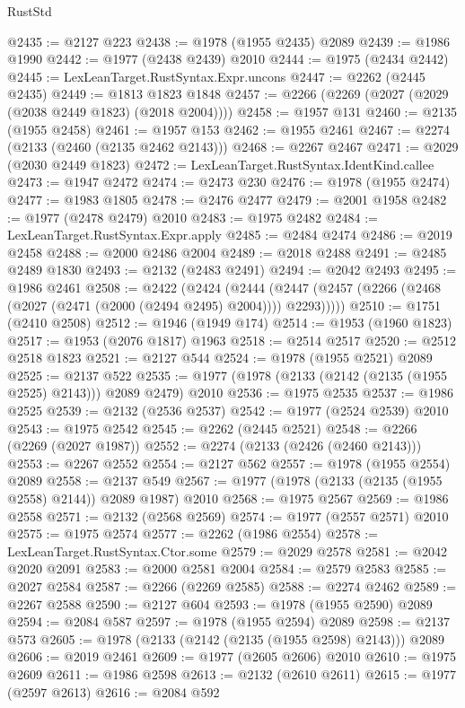 \begin{lexlean}{RustStd}
\begin{coremodule}
{\begin{coremodule}
{{{{{{{{{{{{{{{{{{{{{{{{{{{{{{{@2435 := @2127 @223
@2438 := @1978 (@1955 @2435) @2089
@2439 := @1986 @1990
@2442 := @1977 (@2438 @2439) @2010
@2444 := @1975 (@2434 @2442)
@2445 := LexLeanTarget.RustSyntax.Expr.uncons
@2447 := @2262 (@2445 @2435)
@2449 := @1813 @1823 @1848
@2457 := @2266 (@2269 (@2027 (@2029 (@2038 @2449 @1823) (@2018 @2004))))
@2458 := @1957 @131
@2460 := @2135 (@1955 @2458)
@2461 := @1957 @153
@2462 := @1955 @2461
@2467 := @2274 (@2133 (@2460 (@2135 @2462 @2143)))
@2468 := @2267 @2467
@2471 := @2029 (@2030 @2449 @1823)
@2472 := LexLeanTarget.RustSyntax.IdentKind.callee
@2473 := @1947 @2472
@2474 := @2473 @230
@2476 := @1978 (@1955 @2474)
@2477 := @1983 @1805
@2478 := @2476 @2477
@2479 := @2001 @1958
@2482 := @1977 (@2478 @2479) @2010
@2483 := @1975 @2482
@2484 := LexLeanTarget.RustSyntax.Expr.apply
@2485 := @2484 @2474
@2486 := @2019 @2458
@2488 := @2000 @2486 @2004
@2489 := @2018 @2488
@2491 := @2485 @2489 @1830
@2493 := @2132 (@2483 @2491)
@2494 := @2042 @2493
@2495 := @1986 @2461
@2508 := @2422
    (@2424
      (@2444 (@2447 (@2457 (@2266 (@2468 (@2027 (@2471 (@2000 (@2494 @2495) @2004)))) @2293)))))
@2510 := @1751 (@2410 @2508)
@2512 := @1946 (@1949 @174)
@2514 := @1953 (@1960 @1823)
@2517 := @1953 (@2076 @1817) @1963
@2518 := @2514 @2517
@2520 := @2512 @2518 @1823
@2521 := @2127 @544
@2524 := @1978 (@1955 @2521) @2089
@2525 := @2137 @522
@2535 := @1977 (@1978 (@2133 (@2142 (@2135 (@1955 @2525) @2143))) @2089 @2479) @2010
@2536 := @1975 @2535
@2537 := @1986 @2525
@2539 := @2132 (@2536 @2537)
@2542 := @1977 (@2524 @2539) @2010
@2543 := @1975 @2542
@2545 := @2262 (@2445 @2521)
@2548 := @2266 (@2269 (@2027 @1987))
@2552 := @2274 (@2133 (@2426 (@2460 @2143)))
@2553 := @2267 @2552
@2554 := @2127 @562
@2557 := @1978 (@1955 @2554) @2089
@2558 := @2137 @549
@2567 := @1977 (@1978 (@2133 (@2135 (@1955 @2558) @2144)) @2089 @1987) @2010
@2568 := @1975 @2567
@2569 := @1986 @2558
@2571 := @2132 (@2568 @2569)
@2574 := @1977 (@2557 @2571) @2010
@2575 := @1975 @2574
@2577 := @2262 (@1986 @2554)
@2578 := LexLeanTarget.RustSyntax.Ctor.some
@2579 := @2029 @2578
@2581 := @2042 @2020 @2091
@2583 := @2000 @2581 @2004
@2584 := @2579 @2583
@2585 := @2027 @2584
@2587 := @2266 (@2269 @2585)
@2588 := @2274 @2462
@2589 := @2267 @2588
@2590 := @2127 @604
@2593 := @1978 (@1955 @2590) @2089
@2594 := @2084 @587
@2597 := @1978 (@1955 @2594) @2089
@2598 := @2137 @573
@2605 := @1978 (@2133 (@2142 (@2135 (@1955 @2598) @2143))) @2089
@2606 := @2019 @2461
@2609 := @1977 (@2605 @2606) @2010
@2610 := @1975 @2609
@2611 := @1986 @2598
@2613 := @2132 (@2610 @2611)
@2615 := @1977 (@2597 @2613)
@2616 := @2084 @592
}}}}}}}}}}}}}}}}}}}}}}}}}}}}}}}
\end{coremodule}}
\end{coremodule}
\end{lexlean}
